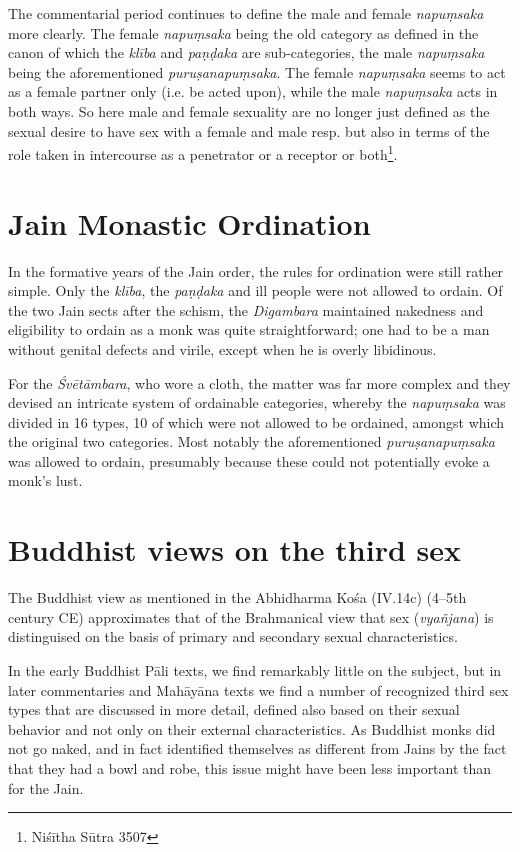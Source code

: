 The commentarial period continues to define the male and female {\em napuṃsaka} more clearly. The female {\em napuṃsaka} being the old category as defined in the canon of which the {\em klība} and {\em paṇḍaka} are sub-categories, the male {\em napuṃsaka} being the aforementioned {\em puruṣanapuṃsaka}. The female {\em napuṃsaka} seems to act as a female partner only (i.e. be acted upon), while the male {\em napuṃsaka} acts in both ways. So here male and female sexuality are no longer just defined as the sexual desire to have sex with a female and male resp. but also in terms of the role taken in intercourse as a penetrator or a receptor or both\footnote{Niśītha Sūtra 3507}.



\section{Jain Monastic Ordination}

In the formative years of the Jain order, the rules for ordination were still rather simple. Only the {\em klība}, the {\em paṇḍaka} and ill people were not allowed to ordain. Of the two Jain sects after the schism, the {\em Digambara} maintained nakedness and eligibility to ordain as a monk was quite straightforward; one had to be a man without genital defects and virile, except when he is overly libidinous. 

For the {\em Śvētāmbara}, who wore a cloth, the matter was far more complex and they devised an intricate system of ordainable categories, whereby the {\em napuṃsaka} was divided in 16 types, 10 of which were not allowed to be ordained, amongst which the original two categories. Most notably the aforementioned {\em puruṣanapuṃsaka} was allowed to ordain, presumably because these could not potentially evoke a monk's lust.




\section{Buddhist views on the third sex}
The Buddhist view as mentioned in the Abhidharma Kośa (IV.14c) (4–5th century CE) approximates that of the Brahmanical view that sex ({\em vyañjana}) is distinguised on the basis of primary and secondary sexual characteristics.

In the early Buddhist Pāli texts, we find remarkably little on the subject, but in later commentaries and Mahāyāna texts we find a number of recognized third sex types that are discussed in more detail, defined also based on their sexual behavior and not only on their external characteristics. As Buddhist monks did not go naked, and in fact identified themselves as different from Jains by the fact that they had a bowl and robe, this issue might have been less important than for the Jain.


